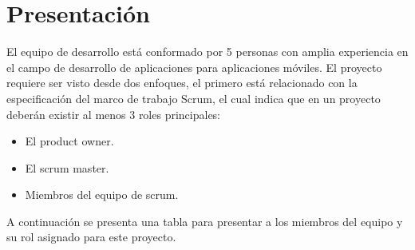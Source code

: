 
\section{Presentación}

El equipo de desarrollo está conformado por 5 personas con amplia experiencia en el campo de desarrollo de aplicaciones para aplicaciones móviles. El proyecto requiere ser visto desde dos enfoques, el primero está relacionado con la especificación del marco de trabajo Scrum, el cual indica que en un proyecto deberán existir al menos 3 roles principales:
	\begin{itemize}
		\item El product owner.
		\item El scrum master.
		\item Miembros del equipo de scrum.
	\end{itemize}

A continuación se presenta una tabla para presentar a los miembros del equipo y su rol asignado para este proyecto.

